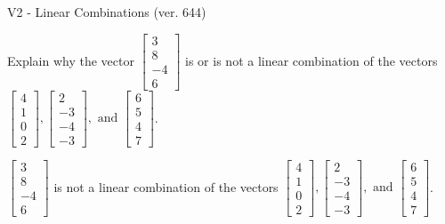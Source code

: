 \begin{exercise}
  \begin{exerciseTitle}V2 - Linear Combinations (ver. 644)\end{exerciseTitle}
  \begin{exerciseStatement}
    Explain why the vector \(\left[\begin{array}{c}
3 \\
8 \\
-4 \\
6
\end{array}\right]\)  is or is not a linear 
	combination of the vectors \(\left[\begin{array}{c}
4 \\
1 \\
0 \\
2
\end{array}\right] , \left[\begin{array}{c}
2 \\
-3 \\
-4 \\
-3
\end{array}\right] , \text{ and } \left[\begin{array}{c}
6 \\
5 \\
4 \\
7
\end{array}\right]\).
	


  \end{exerciseStatement}
  \begin{exerciseAnswer}
   \(\left[\begin{array}{c}
3 \\
8 \\
-4 \\
6
\end{array}\right]\) 
  	 is not  
	a linear combination of the vectors \(\left[\begin{array}{c}
4 \\
1 \\
0 \\
2
\end{array}\right] , \left[\begin{array}{c}
2 \\
-3 \\
-4 \\
-3
\end{array}\right] , \text{ and } \left[\begin{array}{c}
6 \\
5 \\
4 \\
7
\end{array}\right]\).

	
  


  \end{exerciseAnswer}
\end{exercise}